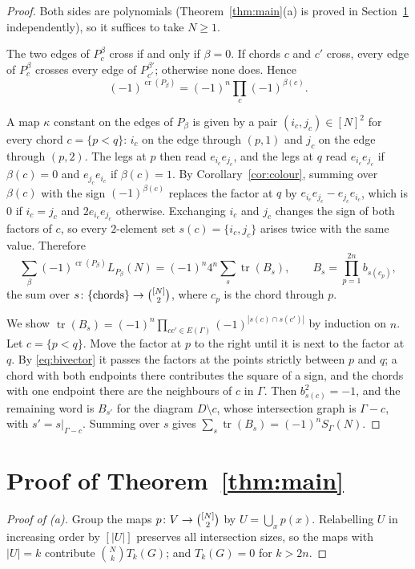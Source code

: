 \documentclass[preprint,12pt]{elsarticle}
\theoremstyle{definition}
\newcommand{\tr}{\operatorname{tr}}
\newcommand{\cro}{\operatorname{cr}}
\newcommand{\binomset}[2]{\tbinom{#1}{#2}}
\begin{document}
\begin{proof}
Both sides are polynomials (Theorem~\ref{thm:main}(a) is proved in Section~\ref{sec:proof} independently), so it suffices to take $N\ge1$.

The two edges of $P_c^\beta$ cross if and only if $\beta=0$. If chords $c$ and $c'$ cross, every edge of $P_c^\beta$ crosses every edge of $P_{c'}^{\beta'}$; otherwise none does. Hence
\[
(-1)^{\cro(P_\beta)}=(-1)^n\prod_c(-1)^{\beta(c)}.
\]

A map $\kappa$ constant on the edges of $P_\beta$ is given by a pair $(i_c,j_c)\in[N]^2$ for every chord $c=\{p<q\}$: $i_c$ on the edge through $(p,1)$ and $j_c$ on the edge through $(p,2)$. The legs at $p$ then read $e_{i_c}e_{j_c}$, and the legs at $q$ read $e_{i_c}e_{j_c}$ if $\beta(c)=0$ and $e_{j_c}e_{i_c}$ if $\beta(c)=1$. By Corollary~\ref{cor:colour}, summing over $\beta(c)$ with the sign $(-1)^{\beta(c)}$ replaces the factor at $q$ by $e_{i_c}e_{j_c}-e_{j_c}e_{i_c}$, which is $0$ if $i_c=j_c$ and $2e_{i_c}e_{j_c}$ otherwise. Exchanging $i_c$ and $j_c$ changes the sign of both factors of $c$, so every $2$-element set $s(c)=\{i_c,j_c\}$ arises twice with the same value. Therefore
\[
\sum_\beta(-1)^{\cro(P_\beta)}L_{P_\beta}(N)=(-1)^n4^n\sum_{s}\tr(B_s),\qquad B_s=\prod_{p=1}^{2n}b_{s(c_p)},
\]
the sum over $s\colon\{\text{chords}\}\to\binomset{[N]}{2}$, where $c_p$ is the chord through $p$.

We show $\tr(B_s)=(-1)^n\prod_{cc'\in E(\Gamma)}(-1)^{|s(c)\cap s(c')|}$ by induction on $n$. Let $c=\{p<q\}$. Move the factor at $p$ to the right until it is next to the factor at $q$. By \eqref{eq:bivector} it passes the factors at the points strictly between $p$ and $q$; a chord with both endpoints there contributes the square of a sign, and the chords with one endpoint there are the neighbours of $c$ in $\Gamma$. Then $b_{s(c)}^2=-1$, and the remaining word is $B_{s'}$ for the diagram $D\setminus c$, whose intersection graph is $\Gamma-c$, with $s'=s|_{\Gamma-c}$. Summing over $s$ gives $\sum_s\tr(B_s)=(-1)^nS_\Gamma(N)$.
\end{proof}

\section{Proof of Theorem~\ref{thm:main}}\label{sec:proof}

\begin{proof}[Proof of (a)]
Group the maps $p\colon V\to\binomset{[N]}{2}$ by $U=\bigcup_xp(x)$. Relabelling $U$ in increasing order by $[|U|]$ preserves all intersection sizes, so the maps with $|U|=k$ contribute $\binom Nk T_k(G)$; and $T_k(G)=0$ for $k>2n$.
\end{proof}
\end{document}
